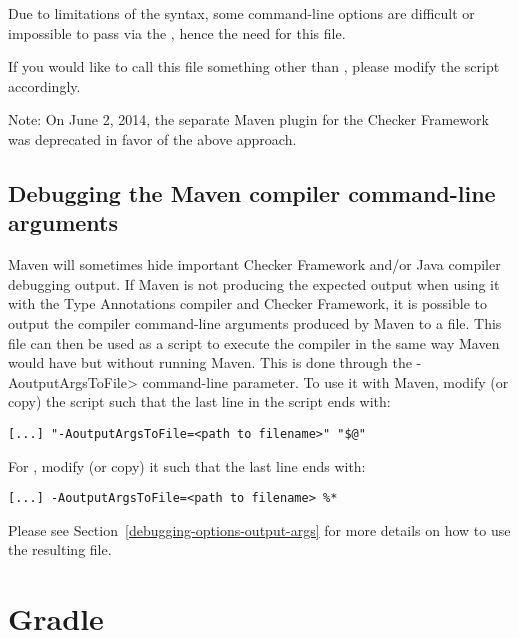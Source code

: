 \begin{enumerate}
Due to limitations of the  syntax, some command-line options are
difficult or impossible to pass via the , hence the need for this file.

If you would like to call this file something other than ,
please modify the  script accordingly.

\medskip

Note: On June 2, 2014, the separate Maven plugin for the Checker
Framework was deprecated in favor of the above  approach.


\subsection{Debugging the Maven compiler command-line arguments\label{debugging-maven-args}}

Maven will sometimes hide important Checker Framework and/or Java compiler debugging output.
If Maven is not producing the expected output when using it with the Type Annotations compiler
and Checker Framework, it is possible to output the compiler command-line arguments produced
by Maven to a file.  This file can then be used as a script to execute the compiler in the
same way Maven would have but without running Maven.  This is done through the
\<-AoutputArgsToFile> command-line parameter.  To use it with Maven, modify (or copy) the
 script such that the last line in the script ends with:

\begin{verbatim}
[...] "-AoutputArgsToFile=<path to filename>" "$@"
\end{verbatim}

For , modify (or copy) it such that the last line ends with:

\begin{verbatim}
[...] -AoutputArgsToFile=<path to filename> %*
\end{verbatim}

Please see Section~\ref{debugging-options-output-args} for more details on how to use
the resulting file.

\end{enumerate}

\section{Gradle\label{gradle}}



